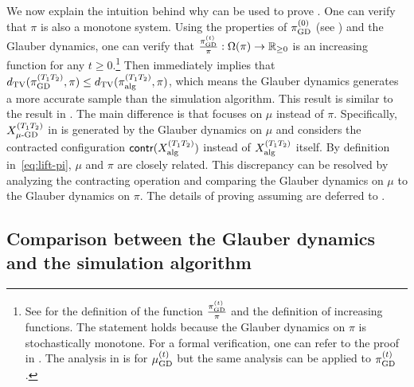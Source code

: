 \documentclass[11pt,a4paper]{article}
\theoremstyle{definition}
\begin{document}
We now explain the intuition behind why  can be used to prove .
One can verify that $\pi$ is also a monotone system. 
Using the properties of $\pi^{(0)}_{\textnormal{GD}}$ (see ) and the Glauber dynamics, one can verify that $\frac{\pi^{(t)}_{\textnormal{GD}}}{\pi}: \Omega(\pi) \to \mathbb{R}_{\geq 0}$ is an increasing function for any $t \geq 0$.\footnote{See  for the definition of the function $\frac{\pi^{(t)}_{\textnormal{GD}}}{\pi}$ and the definition of increasing functions.
The statement holds because the Glauber dynamics on $\pi$ is stochastically monotone.
For a formal verification, one can refer to the proof in . The analysis in  is for $\mu^{(t)}_{\textnormal{GD}}$ but the same analysis can be applied to $\pi^{(t)}_{\textnormal{GD}}$.
}  Then  immediately implies that $d_{\text{TV}}(\pi^{(T_1T_2)}_{\textnormal{GD}},\pi) \leq d_{\text{TV}}(\pi^{(T_1T_2)}_{\textnormal{alg}},\pi)$, which means the Glauber dynamics generates a more accurate sample than the simulation algorithm.
This result is similar to the result in . The main difference is that  focuses on $\mu$ instead of $\pi$. Specifically, $X^{(T_1T_2)}_{\mu\textnormal{-GD}}$ in  is generated by the Glauber dynamics on $\mu$ and  considers the contracted configuration $\textsf{contr}(X^{(T_1T_2)}_{\textnormal{alg}})$ instead of $X^{(T_1T_2)}_{\textnormal{alg}}$ itself. 
By definition in~\eqref{eq:lift-pi}, $\mu$ and $\pi$ are closely related. 
This discrepancy can be resolved by analyzing the contracting operation and comparing the Glauber dynamics on $\mu$ to the Glauber dynamics on $\pi$. 
The details of proving  assuming  are deferred to .







\subsection{Comparison between the Glauber dynamics and the simulation algorithm}

\end{document}
